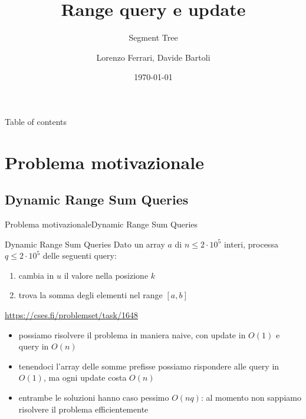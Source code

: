 \documentclass[compress]{beamer}
\title{Range query e update}
\subtitle{Segment Tree}
\author{Lorenzo Ferrari, Davide Bartoli}
\date{\today}
\begin{document}
\begin{frame}
    \maketitle
\end{frame}

\begin{frame}{Table of contents}
  \tableofcontents
\end{frame}

\section{Problema motivazionale}
\subsection{Dynamic Range Sum Queries}
\begin{frame}{Problema motivazionale}{Dynamic Range Sum Queries}
    \begin{exampleblock}{Dynamic Range Sum Queries}
        Dato un array $a$ di $n \leq 2 \cdot 10^5$ interi, processa $q \leq 2 \cdot 10^5$ delle seguenti query:
        \begin{enumerate}
            \item cambia in $u$ il valore nella posizione $k$
            \item trova la somma degli elementi nel range $[a, b]$
        \end{enumerate}
        \small{\underline{\url{https://cses.fi/problemset/task/1648}}}
    \end{exampleblock}
    \pause
    \begin{itemize}
        \item possiamo risolvere il problema in maniera naive, con update in $O(1)$ e query in $O(n)$
        \pause
        \item tenendoci l'array delle somme prefisse possiamo rispondere alle query in $O(1)$, ma ogni update costa $O(n)$
        \pause
        \item entrambe le soluzioni hanno caso pessimo $O(n q)$: al momento non sappiamo risolvere il problema efficientemente
    \end{itemize}
\end{frame}
\end{document}
